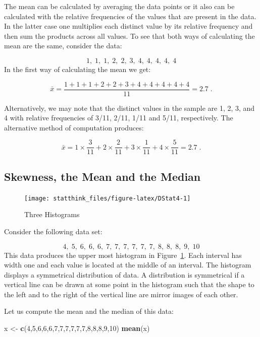 \documentclass[]{krantz}
\makeatletter
\newenvironment{Shaded}{\begin{snugshade}}{\end{snugshade}}
\newcommand{\DecValTok}[1]{\textcolor[rgb]{0.00,0.00,0.81}{#1}}
\newcommand{\KeywordTok}[1]{\textcolor[rgb]{0.13,0.29,0.53}{\textbf{#1}}}
\newcommand{\NormalTok}[1]{#1}
\newcommand{\StringTok}[1]{\textcolor[rgb]{0.31,0.60,0.02}{#1}}
\newenvironment{kframe}{%
\medskip{}
\setlength{\fboxsep}{.8em}
 \def\at@end@of@kframe{}%
 \ifinner\ifhmode%
  \def\at@end@of@kframe{\end{minipage}}%
  \begin{minipage}{\columnwidth}%
 \fi\fi%
 \def\FrameCommand##1{\hskip\@totalleftmargin \hskip-\fboxsep
 \colorbox{shadecolor}{##1}\hskip-\fboxsep
     \hskip-\linewidth \hskip-\@totalleftmargin \hskip\columnwidth}%
 \MakeFramed {\advance\hsize-\width
   \@totalleftmargin\z@ \linewidth\hsize
   \@setminipage}}%
 {\par\unskip\endMakeFramed%
 \at@end@of@kframe}
\renewenvironment{Shaded}{\begin{kframe}}{\end{kframe}}
\theoremstyle{definition}
\theoremstyle{definition}
\theoremstyle{definition}
\theoremstyle{remark}
\makeatother
\begin{document}
The mean can be calculated by averaging the data points or it also can
be calculated with the relative frequencies of the values that are
present in the data. In the latter case one multiplies each distinct
value by its relative frequency and then sum the products across all
values. To see that both ways of calculating the mean are the same,
consider the data:

\[1,\; 1,\; 1,\; 2,\; 2,\; 3,\; 4,\; 4,\; 4,\; 4,\; 4\] In the first
way of calculating the mean we get:

\[\bar x = \frac{1 + 1 + 1 + 2 + 2 + 3 + 4 + 4 + 4 + 4 + 4}{11} = 2.7\;.\]

Alternatively, we may note that the distinct values in the sample are 1,
2, 3, and 4 with relative frequencies of 3/11, 2/11, 1/11 and 5/11,
respectively. The alternative method of computation produces:

\[\bar x = 1\times \frac{3}{11} + 2 \times \frac{2}{11} + 3 \times \frac{1}{11} + 4 \times \frac{5}{11} = 2.7\;.\]

\hypertarget{skewness-the-mean-and-the-median}{%
\subsection{Skewness, the Mean and the Median}\label{skewness-the-mean-and-the-median}}

\begin{figure}

{\centering \texttt{[image: statthink\_files/figure-latex/DStat4-1]} 

}

\caption{Three Histograms}\label{fig:DStat4}
\end{figure}

Consider the following data set:

\[4,\; 5,\; 6,\; 6,\; 6,\; 7,\; 7,\; 7,\; 7,\;  7,\;  7,\;  8,\;  8,\;  8,\;  9,\;  10\]
This data produces the upper most histogram in
Figure~\ref{fig:DStat4}. Each interval has width one and each
value is located at the middle of an interval. The histogram displays a
symmetrical distribution of data. A distribution is symmetrical if a
vertical line can be drawn at some point in the histogram such that the
shape to the left and to the right of the vertical line are mirror
images of each other.

Let us compute the mean and the median of this data:

\begin{Shaded}
\begin{Highlighting}[]
\NormalTok{x <-}\StringTok{ }\KeywordTok{c}\NormalTok{(}\DecValTok{4}\NormalTok{,}\DecValTok{5}\NormalTok{,}\DecValTok{6}\NormalTok{,}\DecValTok{6}\NormalTok{,}\DecValTok{6}\NormalTok{,}\DecValTok{7}\NormalTok{,}\DecValTok{7}\NormalTok{,}\DecValTok{7}\NormalTok{,}\DecValTok{7}\NormalTok{,}\DecValTok{7}\NormalTok{,}\DecValTok{7}\NormalTok{,}\DecValTok{8}\NormalTok{,}\DecValTok{8}\NormalTok{,}\DecValTok{8}\NormalTok{,}\DecValTok{9}\NormalTok{,}\DecValTok{10}\NormalTok{)}
\KeywordTok{mean}\NormalTok{(x)}
\end{Highlighting}
\end{Shaded}
\end{document}
